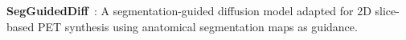 \item \textbf{SegGuidedDiff}~\cite{konz2024anatomically}: A segmentation-guided diffusion model adapted for 2D slice-based PET synthesis using anatomical segmentation maps as guidance.
